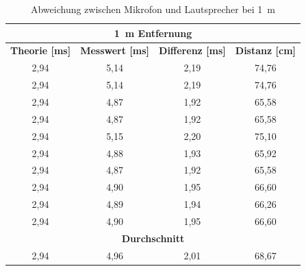 \begin{table}[H]
\centering
\caption{Abweichung zwischen Mikrofon und Lautsprecher bei \SI{1}{m}}
\label{tab:modul_D_1}
\begin{tabular}{|c|c|c|c|}
\hline
\multicolumn{4}{|c|}{\textbf{\SI{1}{\m} Entfernung}}                                                                                                              \\ \hline
\textbf{Theorie [\si{ms}]} & \textbf{Messwert [\si{ms}]} & \multicolumn{1}{l|}{\textbf{Differenz [\si{ms}]}} & \multicolumn{1}{l|}{\textbf{Distanz [\si{cm}]}} \\ \hline
2,94                      & 5,14                       & 2,19                                             & 74,76                                          \\ \hline
2,94                      & 5,14                       & 2,19                                             & 74,76                                          \\ \hline
2,94                      & 4,87                       & 1,92                                             & 65,58                                          \\ \hline
2,94                      & 4,87                       & 1,92                                             & 65,58                                          \\ \hline
2,94                      & 5,15                       & 2,20                                             & 75,10                                          \\ \hline
2,94                      & 4,88                       & 1,93                                             & 65,92                                          \\ \hline
2,94                      & 4,87                       & 1,92                                             & 65,58                                          \\ \hline
2,94                      & 4,90                       & 1,95                                             & 66,60                                          \\ \hline
2,94                      & 4,89                       & 1,94                                             & 66,26                                          \\ \hline
2,94                      & 4,90                       & 1,95                                             & 66,60                                          \\ \hline
\multicolumn{4}{|c|}{\textbf{Durchschnitt}}                                                                                                                \\ \hline
2,94                      & 4,96                       & 2,01                                             & 68,67                                          \\ \hline
\end{tabular}
\end{table}


